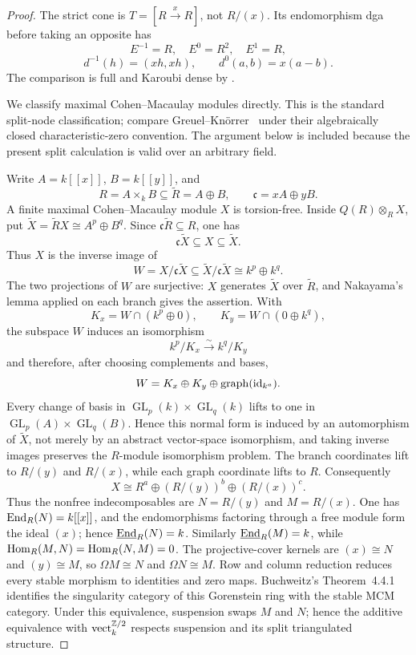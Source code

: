 \begin{proof}
The strict cone is \(T=[R\xrightarrow{x}R]\), not \(R/(x)\).  Its endomorphism dga before taking an opposite has
\[
 E^{-1}=R,\quad E^0=R^2,\quad E^1=R,
\]
\[
 d^{-1}(h)=(xh,xh),\qquad d^0(a,b)=x(a-b).
\]
The comparison is full and Karoubi dense by .

We classify maximal Cohen--Macaulay modules directly.  This is the standard split-node classification; compare Greuel--Kn\"orrer~\cite{GreuelKnorrer85} under their algebraically closed characteristic-zero convention.  The argument below is included because the present split calculation is valid over an arbitrary field.

Write \(A=k[[x]]\), \(B=k[[y]]\), and
\[
 R=A\times_kB\subseteq\widetilde R=A\oplus B,
 \qquad
 \mathfrak c=xA\oplus yB.
\]
A finite maximal Cohen--Macaulay module \(X\) is torsion-free.  Inside \(Q(R)\otimes_RX\), put
\(\widetilde X=\widetilde R X\cong A^p\oplus B^q\).  Since
\(\mathfrak c\widetilde R\subseteq R\), one has
\[
 \mathfrak c\widetilde X\subseteq X\subseteq\widetilde X.
\]
Thus \(X\) is the inverse image of
\[
 W=X/\mathfrak c\widetilde X
 \subseteq
 \widetilde X/\mathfrak c\widetilde X
 \cong k^p\oplus k^q.
\]
The two projections of \(W\) are surjective: \(X\) generates \(\widetilde X\) over \(\widetilde R\), and Nakayama's lemma applied on each branch gives the assertion.  With
\[
 K_x=W\cap(k^p\oplus0),
 \qquad
 K_y=W\cap(0\oplus k^q),
\]
the subspace \(W\) induces an isomorphism
\[
 k^p/K_x\xrightarrow{\sim}k^q/K_y
\]
and therefore, after choosing complements and bases,
\[
 W=K_x\oplus K_y\oplus\operatorname{graph}(\operatorname{id}_{k^a}).
\]
Every change of basis in \(\operatorname{GL}_p(k)\times\operatorname{GL}_q(k)\) lifts to one in \(\operatorname{GL}_p(A)\times\operatorname{GL}_q(B)\).  Hence this normal form is induced by an automorphism of \(\widetilde X\), not merely by an abstract vector-space isomorphism, and taking inverse images preserves the \(R\)-module isomorphism problem.  The branch coordinates lift to \(R/(y)\) and \(R/(x)\), while each graph coordinate lifts to \(R\).  Consequently
\[
 X\cong R^a\oplus(R/(y))^b\oplus(R/(x))^c.
\]
Thus the nonfree indecomposables are \(N=R/(y)\) and \(M=R/(x)\).  One has \(\operatorname{End}_R(N)=k[[x]]\), and the endomorphisms factoring through a free module form the ideal \((x)\); hence \(\underline{\operatorname{End}}_R(N)=k\).  Similarly \(\underline{\operatorname{End}}_R(M)=k\), while \(\operatorname{Hom}_R(M,N)=\operatorname{Hom}_R(N,M)=0\).  The projective-cover kernels are \((x)\cong N\) and \((y)\cong M\), so \(\Omega M\cong N\) and \(\Omega N\cong M\).  Row and column reduction reduces every stable morphism to identities and zero maps.  Buchweitz's Theorem~4.4.1~\cite{Buchweitz} identifies the singularity category of this Gorenstein ring with the stable MCM category.  Under this equivalence, suspension swaps \(M\) and \(N\); hence the additive equivalence with \(\operatorname{vect}_k^{\mathbb Z/2}\) respects suspension and its split triangulated structure.


\end{proof}
